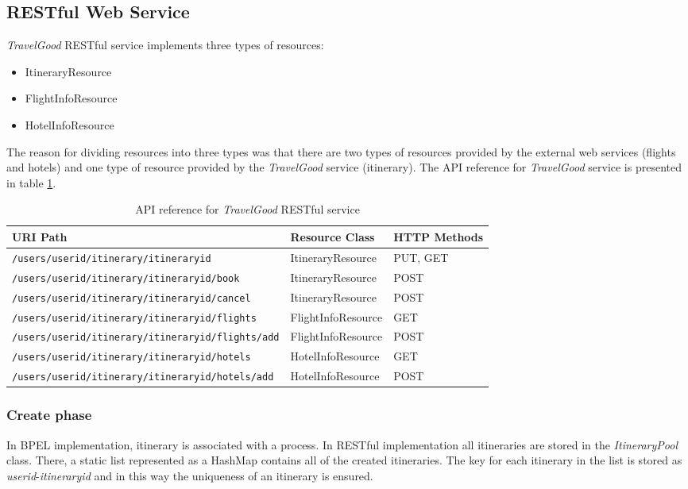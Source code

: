 \subsection{RESTful Web Service}
\textit{TravelGood} RESTful service implements three types of resources:
\begin{itemize}
\item ItineraryResource
\item FlightInfoResource
\item HotelInfoResource
\end{itemize}
The reason for dividing resources into three types was that there are two types of resources provided by the external web services (flights and hotels) and one type of resource provided by the \textit{TravelGood} service (itinerary). The API reference for \textit{TravelGood} service is presented in table \ref{tableAPIref}.

\begin{table}[H]
\begin{adjustwidth}{-1cm}{-1cm}
\centering
\begin{tabular}{|l|l|l|} \hline
\textbf{URI Path} & \textbf{Resource Class} & \textbf{HTTP Methods} \\ \hline
\texttt{/users/{userid}/itinerary/{itineraryid}} & ItineraryResource & PUT, GET \\ \hline
\texttt{/users/{userid}/itinerary/{itineraryid}/book} & ItineraryResource & POST \\ \hline
\texttt{/users/{userid}/itinerary/{itineraryid}/cancel} & ItineraryResource & POST \\ \hline
\texttt{/users/{userid}/itinerary/{itineraryid}/flights} & FlightInfoResource & GET \\ \hline
\texttt{/users/{userid}/itinerary/{itineraryid}/flights/add} & FlightInfoResource & POST \\ \hline
\texttt{/users/{userid}/itinerary/{itineraryid}/hotels} & HotelInfoResource & GET \\ \hline
\texttt{/users/{userid}/itinerary/{itineraryid}/hotels/add} & HotelInfoResource & POST \\ \hline
\end{tabular}
\caption{API reference for \textit{TravelGood} RESTful service}
\label{tableAPIref}
\end{adjustwidth}
\end{table}

\subsubsection*{Create phase}
In BPEL implementation, itinerary is associated with a process. In RESTful implementation all itineraries are stored in the \textit{ItineraryPool} class. There, a static list represented as a HashMap contains all of the created itineraries. The key for each itinerary in the list is stored as \textit{userid}-\textit{itineraryid} and in this way the uniqueness of an itinerary is ensured.

